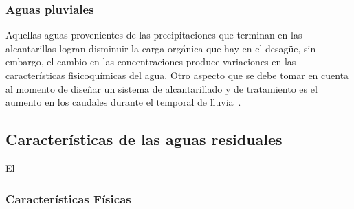 \subsubsection*{Aguas pluviales}
Aquellas aguas provenientes de las precipitaciones que terminan en las alcantarillas logran disminuir la carga orgánica que hay en el desagüe, sin embargo, el cambio en las concentraciones produce variaciones en las características fisicoquímicas del agua. Otro aspecto que se debe tomar en cuenta al momento de diseñar un sistema de alcantarillado y de tratamiento es el aumento en los caudales durante el temporal de lluvia~\citep{lazcano2016}.
\subsection{Características de las aguas residuales}
El 
\subsubsection{Características Físicas}
